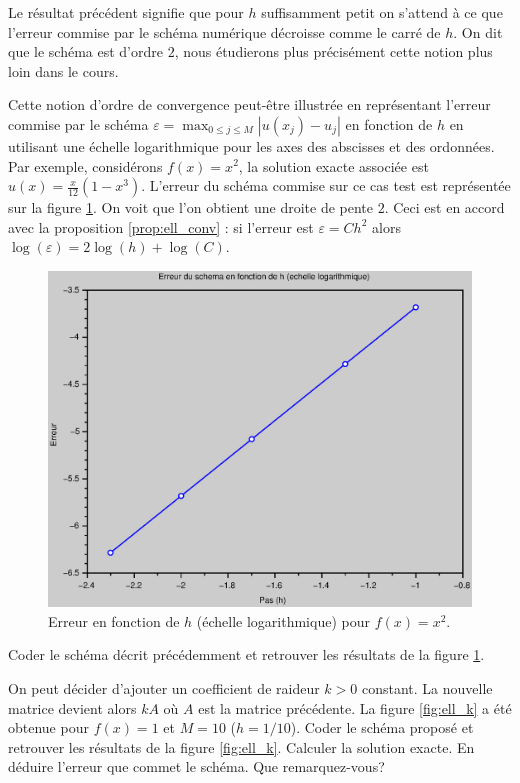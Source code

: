 \documentclass[12pt,a4paper,twoside]{article}
\begin{document}
Le r\'esultat pr\'ec\'edent signifie que pour $h$ suffisamment petit
on s'attend \`a ce que l'erreur commise par le sch\'ema num\'erique d\'ecroisse
comme le carr\'e de $h$.
On dit que le sch\'ema est d'ordre $2$, nous \'etudierons plus pr\'ecis\'ement cette notion
plus loin dans le cours.


Cette notion d'ordre de convergence peut-\^etre illustr\'ee en repr\'esentant 
l'erreur commise par le sch\'ema 
$\varepsilon = \max_{0\leq j \leq M} |u(x_j) - u_j|$ en fonction de $h$ 
en utilisant une \'echelle logarithmique
pour les axes des abscisses et des ordonn\'ees.
Par exemple, consid\'erons $f(x) = x^2$, la solution exacte associ\'ee
est $u(x) = \frac{x}{12}(1-x^3)$.
L'erreur du sch\'ema commise sur ce cas test est repr\'esent\'ee
sur la figure \ref{fig:ell_convergence}.
On voit que l'on obtient une droite de pente $2$.
Ceci est en accord avec la proposition \ref{prop:ell_conv} :
si l'erreur est $\varepsilon = C h^2$ alors
$\log(\varepsilon) = 2 \log(h) + \log(C)$.

\begin{figure}[h]
  \centering
  \includegraphics[width = 12cm]{Figures/Poisson_conv.eps}
  \caption{Erreur en fonction de $h$ (\'echelle logarithmique)
    pour $f(x) = x^2$.}
  \label{fig:ell_convergence}
\end{figure}


\begin{exercise}
  Coder le sch\'ema d\'ecrit pr\'ec\'edemment et retrouver les 
  r\'esultats de la figure \ref{fig:ell_convergence}.
\end{exercise}

\begin{exercise}
  On peut d\'ecider d'ajouter un coefficient de raideur $k>0$ constant.
  La nouvelle matrice devient alors $k A$ o\`u $A$ est la matrice 
  pr\'ec\'edente.
  La figure \ref{fig:ell_k} a \'et\'e obtenue pour $f(x) = 1$
  et $M=10$ ($h=1/10$).
  Coder le sch\'ema propos\'e et retrouver les r\'esultats
  de la figure \ref{fig:ell_k}.
  Calculer la solution exacte.
  En d\'eduire l'erreur que commet le sch\'ema.
  Que remarquez-vous?
\end{exercise}
\end{document}
